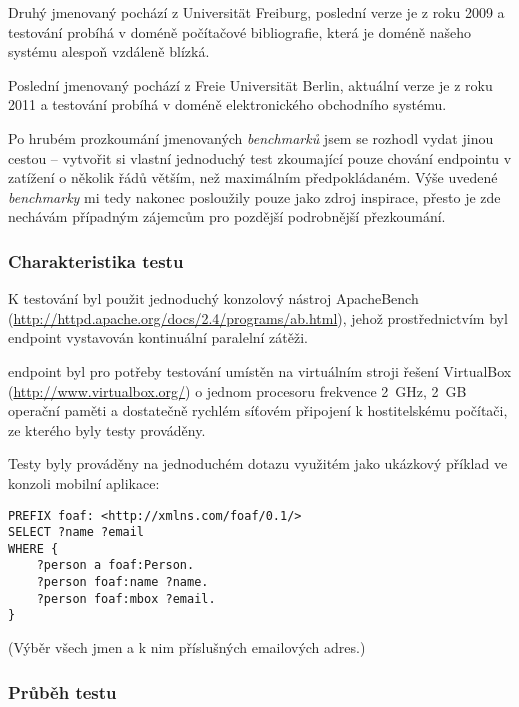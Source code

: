 Druhý jmenovaný pochází z Universität Freiburg, poslední verze je z roku 2009 a testování probíhá v doméně počítačové bibliografie, která je doméně našeho systému alespoň vzdáleně blízká.

Poslední jmenovaný pochází z Freie Universität Berlin, aktuální verze je z roku 2011 a testování probíhá v doméně elektronického obchodního systému.

Po hrubém prozkoumání jmenovaných \textit{benchmarků} jsem se rozhodl vydat jinou cestou -- vytvořit si vlastní jednoduchý test zkoumající pouze chování  endpointu v zatížení o několik řádů větším, než maximálním předpokládaném. Výše uvedené \textit{benchmarky} mi tedy nakonec posloužily pouze jako zdroj inspirace, přesto je zde nechávám případným zájemcům pro pozdější podrobnější přezkoumání.

\subsubsection{Charakteristika testu}
K testování byl použit jednoduchý konzolový nástroj ApacheBench (\url{http://httpd.apache.org/docs/2.4/programs/ab.html}), jehož prostřednictvím byl  endpoint vystavován kontinuální paralelní zátěži.

 endpoint byl pro potřeby testování umístěn na virtuálním stroji řešení VirtualBox (\url{http://www.virtualbox.org/}) o jednom procesoru frekvence 2~GHz, 2~GB operační paměti a dostatečně rychlém síťovém připojení k hostitelskému počítači, ze kterého byly testy prováděny.

Testy byly prováděny na jednoduchém dotazu využitém jako ukázkový příklad ve  konzoli mobilní aplikace:
\begin{verbatim}
PREFIX foaf: <http://xmlns.com/foaf/0.1/>
SELECT ?name ?email
WHERE {
    ?person a foaf:Person.
    ?person foaf:name ?name.
    ?person foaf:mbox ?email.
}
\end{verbatim}
(Výběr všech jmen a k nim příslušných emailových adres.)

\subsubsection{Průběh testu}

